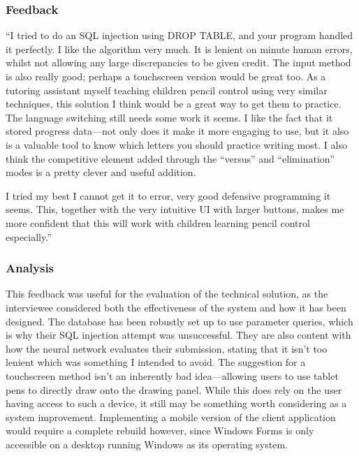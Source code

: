 \documentclass{article}
\begin{document}
\subsubsection{Feedback}

``I tried to do an SQL injection using DROP TABLE, and your program handled it perfectly. I like the algorithm very much. It is lenient on minute human errors, whilst not allowing any large discrepancies to be given credit. The input method is also really good; perhaps a touchscreen version would be great too. As a tutoring assistant myself teaching children pencil control using very similar techniques, this solution I think would be a great way to get them to practice. The language switching still needs some work it seems. I like the fact that it stored progress data---not only does it make it more engaging to use, but it also is a valuable tool to know which letters you should practice writing most. I also think the competitive element added through the ``versus'' and ``elimination'' modes is a pretty clever and useful addition.

I tried my best I cannot get it to error, very good defensive programming it seems. This, together with the very intuitive UI with larger buttons, makes me more confident that this will work with children learning pencil control especially.''

\subsubsection{Analysis}

This feedback was useful for the evaluation of the technical solution, as the interviewee considered both the effectiveness of the system and how it has been designed. The database has been robustly set up to use parameter queries, which is why their SQL injection attempt was unsuccessful. They are also content with how the neural network evaluates their submission, stating that it isn't too lenient which was something I intended to avoid. The suggestion for a touchscreen method isn't an inherently bad idea---allowing users to use tablet pens to directly draw onto the drawing panel. While this does rely on the user having access to such a device, it still may be something worth considering as a system improvement. Implementing a mobile version of the client application would require a complete rebuild however, since Windows Forms is only accessible on a desktop running Windows as its operating system. \\
\end{document}
